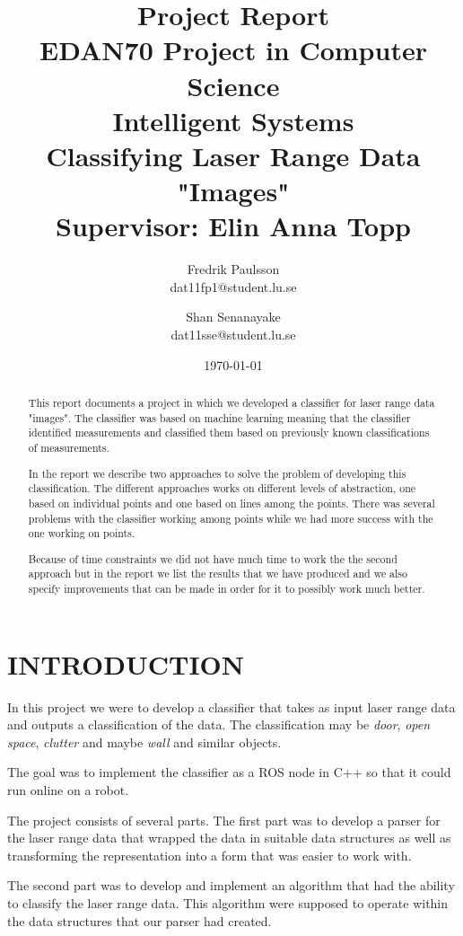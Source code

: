 \documentclass[a4paper, 10pt, conference]{ieeeconf}      %
\title{\LARGE \bf Project Report \\ EDAN70 Project in Computer Science \\ Intelligent Systems \\ Classifying Laser Range Data "Images" \\ Supervisor: Elin Anna Topp}
\date{\today}
\author{Fredrik Paulsson \\ dat11fp1@student.lu.se \and Shan Senanayake \\ dat11sse@student.lu.se}
\begin{document}
\maketitle
\thispagestyle{empty}
\pagestyle{empty}


\begin{abstract}
This report documents a project in which we developed a classifier for laser range data "images". The classifier was based on machine learning meaning that the classifier identified measurements and classified them based on previously known classifications of measurements.

In the report we describe two approaches to solve the problem of developing this classification. The different approaches works on different levels of abstraction, one based on individual points and one based on lines among the points. There was several problems with the classifier working among points while we had more success with the one working on points.

Because of time constraints we did not have much time to work the the second approach but in the report we list the results that we have produced and we also specify improvements that can be made in order for it to possibly work much better.


\end{abstract}


\section{INTRODUCTION}

In this project we were to develop a classifier that takes as input laser range data and outputs a classification of the data. The classification may be \emph{door}, \emph{open space}, \emph{clutter} and maybe \emph{wall} and similar objects.

The goal was to implement the classifier as a ROS node in C++ so that it could run online on a robot.

The project consists of several parts. The first part was to develop a parser for the laser range data that wrapped the data in suitable data structures as well as transforming the representation into a form that was easier to work with.

The second part was to develop and implement an algorithm that had the ability to classify the laser range data. This algorithm were supposed to operate within the data structures that our parser had created.
\end{document}
